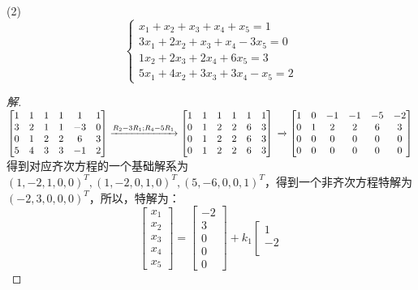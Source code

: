\documentclass[10pt,a4paper]{report}
\begin{document}
\noindent (2)
$$
\left\{
\begin{aligned}
x_{1}+x_{2}+x_{3}+x_{4}+x_{5}=1 \\
3x_{1}+2x_{2}+x_{3}+x_{4}-3x_{5}=0 \\
1x_{2}+2x_{3}+2x_{4}+6x_{5}=3 \\
5x_{1}+4x_{2}+3x_{3}+3x_{4}-x_{5}=2
\end{aligned}
\right.
$$
\begin{proof}[解]
	$
	\left[
	\begin{matrix}
	1 & 1 & 1 & 1 & 1 & 1\\
	3 & 2 & 1 & 1 & -3 & 0\\
	0 & 1 & 2 & 2 & 6 & 3\\
	5 & 4 & 3 & 3 & -1 & 2
	\end{matrix}
	\right]
	\xrightarrow{R_{2}-3R_{1};R_{4}-5R_{1}}
	\left[
	\begin{matrix}
	1 & 1 & 1 & 1 & 1 & 1\\
	0 & 1 & 2 & 2 & 6 & 3\\
	0 & 1 & 2 & 2 & 6 & 3\\
	0 & 1 & 2 & 2 & 6 & 3
	\end{matrix}
	\right]\\
	\xrightarrow{}
	\left[
	\begin{matrix}
	1 & 0 & -1 & -1 & -5 & -2\\
	0 & 1 & 2 & 2 & 6 & 3\\
	0 & 0 & 0 & 0 & 0 & 0\\
	0 & 0 & 0 & 0 & 0 & 0
	\end{matrix}
	\right]\\
	$
	得到对应齐次方程的一个基础解系为$(1,-2,1,0,0)^{T},(1,-2,0,1,0)^{T},(5,-6,0,0,1)^{T}$，得到一个非齐次方程特解为$(-2,3,0,0,0)^{T}$，所以，特解为：
	$$
	\left[
	\begin{matrix}
	x_{1}\\
	x_{2}\\
	x_{3}\\
	x_{4}\\
	x_{5}
	\end{matrix}
	\right] = 
	\left[
	\begin{matrix}
	-2\\
	3\\
	0\\
	0\\
	0
	\end{matrix}
	\right] + k_{1}
	\left[
	\begin{matrix}
	1\\
	-2\\

\end{matrix}$$
\end{proof}
\end{document}
